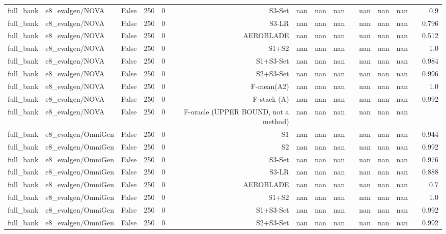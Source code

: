 \begin{table}[htbp]
\begin{tabular}{llrrrrrrrrrrrrr}
full\_bank & e8\_evalgen/NOVA & False & 250 & 0 & S3-Set & nan & nan & nan &  & nan & nan & nan &  & 0.9 \\
full\_bank & e8\_evalgen/NOVA & False & 250 & 0 & S3-LR & nan & nan & nan &  & nan & nan & nan &  & 0.796 \\
full\_bank & e8\_evalgen/NOVA & False & 250 & 0 & AEROBLADE & nan & nan & nan &  & nan & nan & nan &  & 0.512 \\
full\_bank & e8\_evalgen/NOVA & False & 250 & 0 & S1+S2 & nan & nan & nan &  & nan & nan & nan &  & 1.0 \\
full\_bank & e8\_evalgen/NOVA & False & 250 & 0 & S1+S3-Set & nan & nan & nan &  & nan & nan & nan &  & 0.984 \\
full\_bank & e8\_evalgen/NOVA & False & 250 & 0 & S2+S3-Set & nan & nan & nan &  & nan & nan & nan &  & 0.996 \\
full\_bank & e8\_evalgen/NOVA & False & 250 & 0 & F-mean(A2) & nan & nan & nan &  & nan & nan & nan &  & 1.0 \\
full\_bank & e8\_evalgen/NOVA & False & 250 & 0 & F-stack (A) & nan & nan & nan &  & nan & nan & nan &  & 0.992 \\
full\_bank & e8\_evalgen/NOVA & False & 250 & 0 & F-oracle (UPPER BOUND, not a method) & nan & nan & nan &  & nan & nan & nan &  &  \\
full\_bank & e8\_evalgen/OmniGen & False & 250 & 0 & S1 & nan & nan & nan &  & nan & nan & nan &  & 0.944 \\
full\_bank & e8\_evalgen/OmniGen & False & 250 & 0 & S2 & nan & nan & nan &  & nan & nan & nan &  & 0.992 \\
full\_bank & e8\_evalgen/OmniGen & False & 250 & 0 & S3-Set & nan & nan & nan &  & nan & nan & nan &  & 0.976 \\
full\_bank & e8\_evalgen/OmniGen & False & 250 & 0 & S3-LR & nan & nan & nan &  & nan & nan & nan &  & 0.888 \\
full\_bank & e8\_evalgen/OmniGen & False & 250 & 0 & AEROBLADE & nan & nan & nan &  & nan & nan & nan &  & 0.7 \\
full\_bank & e8\_evalgen/OmniGen & False & 250 & 0 & S1+S2 & nan & nan & nan &  & nan & nan & nan &  & 1.0 \\
full\_bank & e8\_evalgen/OmniGen & False & 250 & 0 & S1+S3-Set & nan & nan & nan &  & nan & nan & nan &  & 0.992 \\
full\_bank & e8\_evalgen/OmniGen & False & 250 & 0 & S2+S3-Set & nan & nan & nan &  & nan & nan & nan &  & 0.992 \\

\end{tabular}
\end{table}
